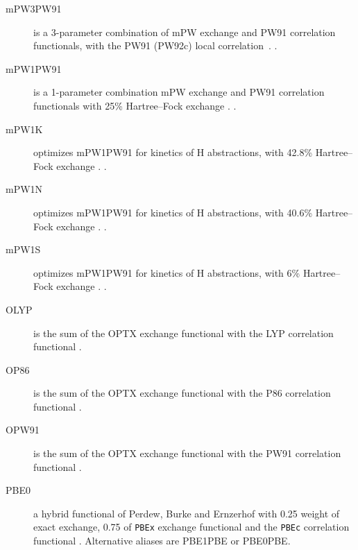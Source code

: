 \begin{description}
\item[mPW3PW91] is a 3-parameter combination of mPW exchange and PW91 correlation
  functionals, with the PW91 (PW92c) local correlation~\cite{dft:mpw}.
  .

\item[mPW1PW91] is a 1-parameter combination mPW exchange and PW91 correlation
  functionals with 25\% Hartree--Fock exchange \cite{dft:mpw}.
  .

\item[mPW1K] optimizes mPW1PW91 for kinetics of H abstractions, with 42.8\% Hartree--Fock
  exchange \cite{dft:mpw1k}.
  .

\item[mPW1N] optimizes mPW1PW91 for kinetics of H abstractions, with 40.6\% Hartree--Fock
  exchange \cite{dft:mpw1n}.
  .

\item[mPW1S] optimizes mPW1PW91 for kinetics of H abstractions, with 6\% Hartree--Fock
  exchange \cite{dft:mpw1s}.
  .

\item[OLYP] is the sum of the OPTX exchange functional with the
  LYP correlation functional \cite{dft:optx,dft:lyp1,dft:lyp2}.

\item[OP86] is the sum of the OPTX exchange functional with the
  P86 correlation functional \cite{dft:optx,dft:p86}.

\item[OPW91] is the sum of the OPTX exchange functional with the
  PW91 correlation functional \cite{dft:optx,dft:pw91}.

\item[PBE0] a hybrid functional of Perdew, Burke and Ernzerhof with
  0.25 weight of exact exchange, 0.75 of \verb|PBEx| exchange functional and
  the \verb|PBEc| correlation functional \cite{dft:pbe0}.
  Alternative aliases are PBE1PBE or PBE0PBE.


\end{description}

